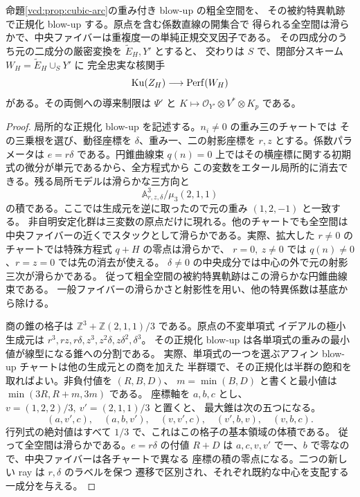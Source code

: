 \begin{theorem}[半安定モデル内の二成分への実核]\label{vbm:thm:semistable-pair}
命題\ref{vcd:prop:cubic-arc}の重み付き blow-up の粗全空間を、
その被約特異軌跡で正規化 blow-up する。原点を含む係数直線の開集合で
得られる全空間は滑らかで、中央ファイバーは重複度一の単純正規交叉因子である。
その四成分のうち元の二成分の厳密変換を $\widetilde E_H,Y'$ とすると、
交わりは $S$ で、閉部分スキーム $W_H=\widetilde E_H\cup_S Y'$ に
完全忠実な核関手
\[
                     \operatorname{Ku}(Z_H)\longrightarrow\operatorname{Perf}(W_H)
\]
がある。その両側への導来制限は $\Psi'$ と
$K\mapsto\mathcal O_{Y'}\otimes V^*\otimes K_p$ である。
\end{theorem}
\begin{proof}
局所的な正規化 blow-up を記述する。$n_i\ne0$ の重み三のチャートでは
その三乗根を選び、動径座標を $\delta$、重み一、二の射影座標を $r,z$
とする。係数パラメータは $e=r\delta$ である。円錐曲線束 $q(n)=0$
上ではその横座標に関する初期式の微分が単元であるから、全方程式から
この変数をエタール局所的に消去できる。残る局所モデルは滑らかな三方向と
\[
        \mathbb A^3_{r,z,\delta}/\mu_3(2,1,1)
\]
の積である。ここでは生成元を逆に取ったので元の重み $(1,2,-1)$ と一致する。
非自明安定化群は三変数の原点だけに現れる。他のチャートでも全空間は
中央ファイバーの近くでスタックとして滑らかである。実際、拡大した
$r\ne0$ のチャートでは特殊方程式 $q+H$ の零点は滑らかで、
$r=0,\ z\ne0$ では $q(n)\ne0$、$r=z=0$ では先の消去が使える。
$\delta\ne0$ の中央成分では中心の外で元の射影三次が滑らかである。
従って粗全空間の被約特異軌跡はこの滑らかな円錐曲線束である。
一般ファイバーの滑らかさと射影性を用い、他の特異係数は基底から除ける。

商の錐の格子は $\mathbb Z^3+\mathbb Z(2,1,1)/3$ である。原点の不変単項式
イデアルの極小生成元は $r^3,rz,r\delta,z^3,z^2\delta,z\delta^2,\delta^3$。
その正規化 blow-up は各単項式の重みの最小値が線型になる錐への分割である。
実際、単項式の一つを選ぶアフィン blow-up チャートは他の生成元との商を加えた
半群環で、その正規化は半群の飽和を取ればよい。非負付値を $(R,B,D)$、
$m=\min(B,D)$ と書くと最小値は $\min(3R,R+m,3m)$ である。
座標軸を $a,b,c$ とし、$v=(1,2,2)/3,\ v'=(2,1,1)/3$ と置くと、
最大錐は次の五つになる。
\[
  (a,v',c),\quad (a,b,v'),\quad(v,v',c),\quad(v',b,v),\quad(v,b,c).
\]
行列式の絶対値はすべて $1/3$ で、これはこの格子の基本領域の体積である。
従って全空間は滑らかである。$e=r\delta$ の付値 $R+D$ は
$a,c,v,v'$ で一、$b$ で零なので、中央ファイバーは各チャートで異なる
座標の積の零点になる。二つの新しい ray は $r,\delta$ のラベルを保つ
遷移で区別され、それぞれ既約な中心を支配する一成分を与える。


\end{proof}
